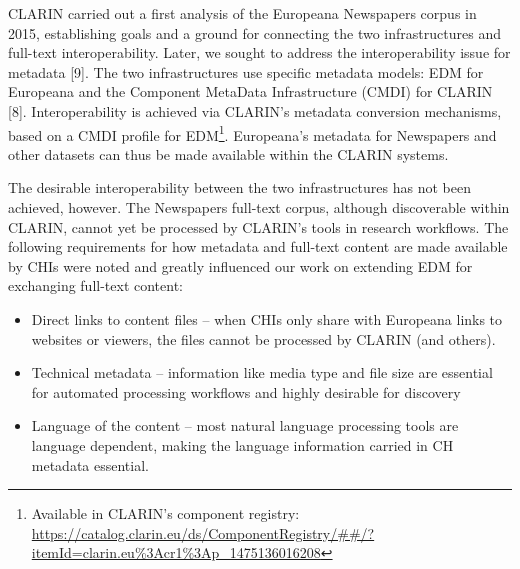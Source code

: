 \documentclass[a4paper,UKenglish,cleveref, autoref]{oasics-v2019}
\begin{document}
CLARIN carried out a first analysis of the Europeana Newspapers corpus in 2015, establishing goals and a ground for connecting the two infrastructures and full-text interoperability. Later, we sought to address the interoperability issue for metadata [9]. The two infrastructures use specific metadata models: EDM for Europeana and the Component MetaData Infrastructure (CMDI) for CLARIN [8]. Interoperability is achieved via CLARIN's metadata conversion mechanisms, based on a CMDI profile for 
EDM\footnote{Available in CLARIN’s component registry:  \url{https://catalog.clarin.eu/ds/ComponentRegistry/##/?itemId=clarin.eu\%3Acr1\%3Ap_1475136016208}}.
Europeana's metadata for Newspapers and other datasets can thus be made available within the CLARIN systems. 

The desirable interoperability between the two infrastructures has not been achieved, however. The Newspapers full-text corpus, although discoverable within CLARIN, cannot yet be processed by CLARIN's tools in research workflows. The following requirements for how metadata and full-text content are made available by CHIs were noted and greatly influenced our work on extending EDM for exchanging full-text content:
\begin{itemize}
\item Direct links to content files – when CHIs only share with Europeana links to websites or viewers, the files cannot be processed by CLARIN (and others).
\item Technical metadata – information like media type and file size are essential for automated processing workflows and highly desirable for discovery
\item Language of the content – most natural language processing tools are language dependent, making the language information carried in CH metadata essential.
\end{itemize}
\end{document}
